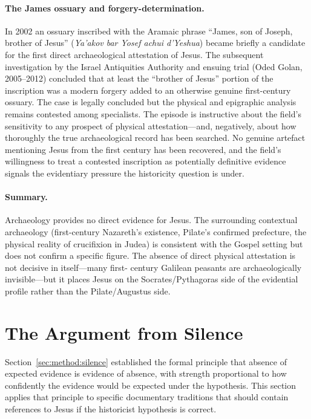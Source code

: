 \documentclass[12pt,oneside]{article}
\newcommand{\grk}[1]{\textit{#1}}   %
\begin{document}
\paragraph{The James ossuary and forgery-determination.}
In 2002 an ossuary inscribed with the Aramaic phrase
\enquote{James, son of Joseph, brother of Jesus}
(\grk{Ya'akov bar Yosef achui d'Yeshua}) became briefly a
candidate for the first direct archaeological attestation of
Jesus.  The subsequent investigation by the Israel Antiquities
Authority and ensuing trial (Oded Golan, 2005--2012) concluded that
at least the \enquote{brother of Jesus} portion of the inscription
was a modern forgery added to an otherwise genuine first-century
ossuary.  The case is legally concluded but the physical and
epigraphic analysis remains contested among specialists.  The
episode is instructive about the field's sensitivity to any
prospect of physical attestation---and, negatively, about how
thoroughly the true archaeological record has been searched.  No
genuine artefact mentioning Jesus from the first century has been
recovered, and the field's willingness to treat a contested
inscription as potentially definitive evidence signals the evidentiary
pressure the historicity question is under.

\paragraph{Summary.}
Archaeology provides no direct evidence for Jesus.  The
surrounding contextual archaeology (first-century Nazareth's
existence, Pilate's confirmed prefecture, the physical reality of
crucifixion in Judea) is consistent with the Gospel setting but
does not confirm a specific figure.  The absence of direct
physical attestation is not decisive in itself---many first-
century Galilean peasants are archaeologically invisible---but it
places Jesus on the Socrates/Pythagoras side of the evidential
profile rather than the Pilate/Augustus side.


\section{The Argument from Silence}
\label{sec:silence}

Section~\ref{sec:method:silence} established the formal principle that
absence of expected evidence is evidence of absence, with strength
proportional to how confidently the evidence would be expected under the
hypothesis.  This section applies that principle to specific documentary
traditions that should contain references to Jesus if the historicist
hypothesis is correct.
\end{document}
